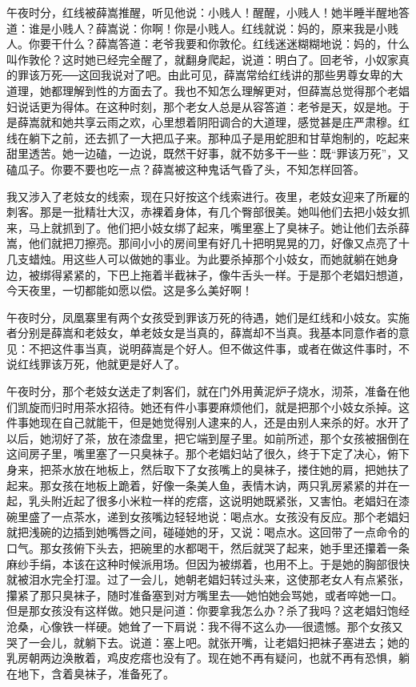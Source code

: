 午夜时分，红线被薛嵩推醒，听见他说：小贱人！醒醒，小贱人！她半睡半醒地答道：谁是小贱人？薛嵩说：你啊！你是小贱人。红线就说：妈的，原来我是小贱人。你要干什么？薛嵩答道：老爷我要和你敦伦。红线迷迷糊糊地说：妈的，什么叫作敦伦？这时她已经完全醒了，就翻身爬起，说道：明白了。回老爷，小奴家真的罪该万死──这回我说对了吧。由此可见，薛嵩常给红线讲的那些男尊女卑的大道理，她都理解到性的方面去了。我也不知怎么理解更对，但薛嵩总觉得那个老娼妇说话更为得体。在这种时刻，那个老女人总是从容答道：老爷是天，奴是地。于是薛嵩就和她共享云雨之欢，心里想着阴阳调合的大道理，感觉甚是庄严肃穆。红线在躺下之前，还去抓了一大把瓜子来。那种瓜子是用蛇胆和甘草炮制的，吃起来甜里透苦。她一边磕，一边说，既然干好事，就不妨多干一些：既“罪该万死”，又磕瓜子。你要不要也吃一点？薛嵩被这种鬼话气昏了头，不知怎样回答。 

我又涉入了老妓女的线索，现在只好按这个线索进行。夜里，老妓女迎来了所雇的刺客。那是一批精壮大汉，赤裸着身体，有几个臀部很美。她叫他们去把小妓女抓来，马上就抓到了。他们把小妓女绑了起来，嘴里塞上了臭袜子。她让他们去杀薛嵩，他们就把刀擦亮。那间小小的房间里有好几十把明晃晃的刀，好像又点亮了十几支蜡烛。用这些人可以做她的事业。为此要杀掉那个小妓女，而她就躺在她身边，被绑得紧紧的，下巴上拖着半截袜子，像牛舌头一样。于是那个老娼妇想道，今天夜里，一切都能如愿以偿。这是多么美好啊！ 

午夜时分，凤凰寨里有两个女孩受到罪该万死的待遇，她们是红线和小妓女。实施者分别是薛嵩和老妓女，单老妓女是当真的，薛嵩却不当真。我基本同意作者的意见：不把这件事当真，说明薛嵩是个好人。但不做这件事，或者在做这件事时，不说红线罪该万死，他就更是好人了。 

午夜时分，那个老妓女送走了刺客们，就在门外用黄泥炉子烧水，沏茶，准备在他们凯旋而归时用茶水招待。她还有件小事要麻烦他们，就是把那个小妓女杀掉。这件事她现在自己就能干，但是她觉得别人逮来的人，还是由别人来杀的好。水开了以后，她沏好了茶，放在漆盘里，把它端到屋子里。如前所述，那个女孩被捆倒在这间房子里，嘴里塞了一只臭袜子。那个老娼妇站了很久，终于下定了决心，俯下身来，把茶水放在地板上，然后取下了女孩嘴上的臭袜子，搂住她的肩，把她扶了起来。那女孩在地板上跪着，好像一条美人鱼，表情木讷，两只乳房紧紧的并在一起，乳头附近起了很多小米粒一样的疙瘩，这说明她既紧张，又害怕。老娼妇在漆碗里盛了一点茶水，递到女孩嘴边轻轻地说：喝点水。女孩没有反应。那个老娼妇就把浅碗的边插到她嘴唇之间，碰碰她的牙，又说：喝点水。这回带了一点命令的口气。那女孩俯下头去，把碗里的水都喝干，然后就哭了起来，她手里还攥着一条麻纱手绢，本该在这种时候派用场。但因为被绑着，也用不上。于是她的胸部很快就被泪水完全打湿。过了一会儿，她朝老娼妇转过头来，这使那老女人有点紧张，攥紧了那只臭袜子，随时准备塞到对方嘴里去──她怕她会骂她，或者啐她一口。但是那女孩没有这样做。她只是问道：你要拿我怎么办？杀了我吗？这老娼妇饱经沧桑，心像铁一样硬。她耸了一下肩说：我不得不这么办──很遗憾。那个女孩又哭了一会儿，就躺下去。说道：塞上吧。就张开嘴，让老娼妇把袜子塞进去；她的乳房朝两边涣散着，鸡皮疙瘩也没有了。现在她不再有疑问，也就不再有恐惧，躺在地下，含着臭袜子，准备死了。 

